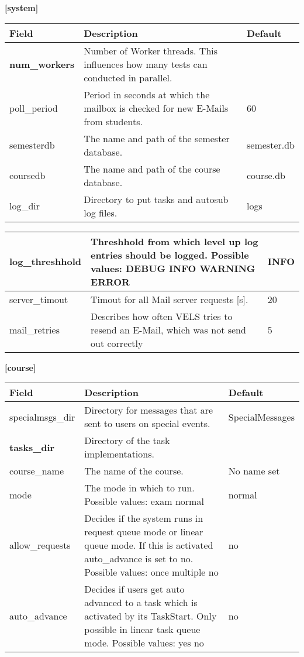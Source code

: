 {\bf [system]}\\
\begin{tabular}{|p{2.5cm}|p{8cm}|p{2.5cm}|}
\hline
{\bf Field} & {\bf Description} & {\bf Default}\\
\hline
\hline
\textbf{num\_workers} & Number of Worker threads. This influences how many tests can conducted
    in parallel. & ~ \\
\hline
poll\_period & Period in seconds at which the mailbox is checked for new E-Mails from students. & 60\\
\hline
semesterdb & The name and path of the semester database. & semester.db\\
\hline
coursedb &  The name and path of the course database. & course.db\\
\hline
log\_dir & Directory to put tasks and autosub log files. & logs  \\
\hline
\end{tabular}
\begin{tabular}{|p{2.5cm}|p{8cm}|p{2.5cm}|}
\hline
log\_threshhold & Threshhold from which level up log entries should be logged.
    Possible values: DEBUG INFO WARNING ERROR & INFO\\
\hline
\hline
server\_timout & Timout for all Mail server requests [s]. & 20  \\
\hline
\hline
mail\_retries & Describes how often VELS tries to resend an E-Mail, which was not send out correctly & 5  \\
\hline
\end{tabular}

{\bf [course]}\\
\begin{tabular}{|p{2.5cm}|p{8cm}|p{2.5cm}|}
\hline
{\bf Field} & {\bf Description} & {\bf Default}\\
\hline
\hline
specialmsgs\_dir & Directory for messages that are sent to users on special events. &
    SpecialMessages \\
\hline
\textbf{tasks\_dir} & Directory of the task implementations. & ~ \\
\hline
course\_name & The name of the course. & No name set \\
\hline
mode & The mode in which to run. Possible values: exam normal & normal \\
\hline
allow\_requests & Decides if the system runs in request queue mode or linear queue mode. If this is activated
    auto\_advance is set to no. Possible values: once multiple no & no \\
\hline
auto\_advance & Decides if users get auto advanced to a task which is activated by its
    TaskStart. Only possible in linear task queue mode. Possible values: yes no & no \\
\hline
\end{tabular}


